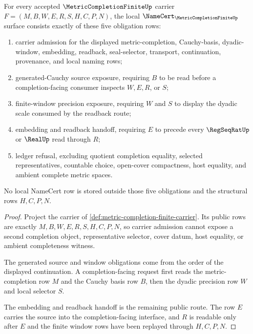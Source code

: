 \begin{theorem}
\label{thm:metric-completion-finite-namecert-obligations}
For every accepted $\MetricCompletionFiniteUp$ carrier $F=(M,B,W,E,R,S,H,C,P,N)$, the local $\NameCert_{\MetricCompletionFiniteUp}$ surface consists exactly of these five obligation rows:
\begin{enumerate}
\item carrier admission for the displayed metric-completion, Cauchy-basis, dyadic-window, embedding, readback, seal-selector, transport, continuation, provenance, and local naming rows;
\item generated-Cauchy source exposure, requiring $B$ to be read before a completion-facing consumer inspects $W,E,R$, or $S$;
\item finite-window precision exposure, requiring $W$ and $S$ to display the dyadic scale consumed by the readback route;
\item embedding and readback handoff, requiring $E$ to precede every $\RegSeqRatUp$ or $\RealUp$ read through $R$;
\item ledger refusal, excluding quotient completion equality, selected representatives, countable choice, open-cover compactness, host equality, and ambient complete metric spaces.
\end{enumerate}
No local NameCert row is stored outside those five obligations and the structural rows $H,C,P,N$.
\end{theorem}
\begin{proof}
Project the carrier of \autoref{def:metric-completion-finite-carrier}. Its public rows are exactly $M,B,W,E,R,S,H,C,P,N$, so carrier admission cannot expose a second completion object, representative selector, cover datum, host equality, or ambient completeness witness.

The generated source and window obligations come from the order of the displayed continuation. A completion-facing request first reads the metric-completion row $M$ and the Cauchy basis row $B$, then the dyadic precision row $W$ and local selector $S$.

The embedding and readback handoff is the remaining public route. The row $E$ carries the source into the completion-facing interface, and $R$ is readable only after $E$ and the finite window rows have been replayed through $H,C,P,N$.
\end{proof}

